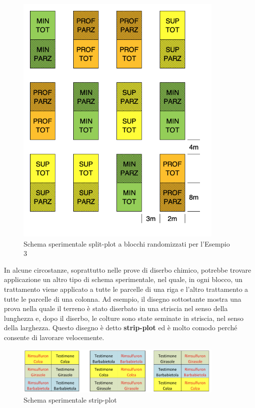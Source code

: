 \documentclass[a4paper,12pt,oneside]{book}
\begin{document}
\begin{figure}
\centering
\includegraphics[width=0.90000\textwidth]{_images/Mappa3SPLIT.png}
\caption{Schema sperimentale split-plot a blocchi randomizzati per
l'Esempio 3}
\end{figure}

In alcune circostanze, soprattutto nelle prove di diserbo chimico,
potrebbe trovare applicazione un altro tipo di schema sperimentale, nel
quale, in ogni blocco, un trattamento viene applicato a tutte le
parcelle di una riga e l'altro trattamento a tutte le parcelle di una
colonna. Ad esempio, il disegno sottostante mostra una prova nella quale
il terreno è stato diserbato in una striscia nel senso della lunghezza
e, dopo il diserbo, le colture sono state seminate in striscia, nel
senso della larghezza. Questo disegno è detto \textbf{strip-plot} ed è
molto comodo perché consente di lavorare velocemente.

\begin{figure}
\centering
\includegraphics[width=0.90000\textwidth]{_images/MappaStrip.png}
\caption{Schema sperimentale strip-plot}
\end{figure}
\end{document}
